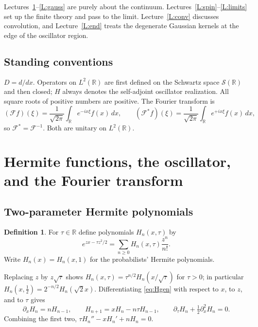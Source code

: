 \documentclass[11pt,reqno]{amsart}
\theoremstyle{definition}
\newtheorem{definition}[theorem]{Definition}
\theoremstyle{remark}
\newcommand{\R}{\mathbb R}
\newcommand{\F}{\mathcal F}
\begin{document}
Lectures~\ref{L:hermite}--\ref{L:gauss} are purely about the continuum.
Lectures~\ref{L:spin}--\ref{L:limits} set up the finite theory and pass to
the limit. Lecture~\ref{L:conv} discusses convolution, and
Lecture~\ref{L:end} treats the degenerate Gaussian kernels at the edge
of the oscillator region.

\subsection*{Standing conventions}
$D=d/dx$. Operators on $L^2(\R)$ are first defined on the Schwartz
space $\mathcal S(\R)$ and then closed; $H$ always denotes the
self-adjoint oscillator realization. All square roots of positive numbers
are positive. The Fourier transform is
\begin{equation}\label{eq:F}
(\F f)(\xi)=\frac1{\sqrt{2\pi}}\int_\R e^{-ix\xi}f(x)\,dx,\qquad
(\F^*f)(\xi)=\frac1{\sqrt{2\pi}}\int_\R e^{+ix\xi}f(x)\,dx,
\end{equation}
so $\F^*=\F^{-1}$. Both are unitary on $L^2(\R)$.

\section{Hermite functions, the oscillator, and the Fourier transform}\label{L:hermite}

\subsection{Two-parameter Hermite polynomials}
\begin{definition}
For $\tau\in\R$ define polynomials $H_n(x,\tau)$ by
\begin{equation}\label{eq:Hgen}
e^{zx-\tau z^2/2}=\sum_{n\ge0}H_n(x,\tau)\frac{z^n}{n!}.
\end{equation}
Write $H_n(x)=H_n(x,1)$ for the probabilists' Hermite polynomials.
\end{definition}
Replacing $z$ by $z\sqrt\tau$ shows $H_n(x,\tau)=\tau^{n/2}H_n(x/\sqrt\tau)$
for $\tau>0$; in particular $H_n(x,\tfrac12)=2^{-n/2}H_n(\sqrt2x)$.
Differentiating \eqref{eq:Hgen} with respect to $x$, to $z$, and to
$\tau$ gives
\begin{equation}\label{eq:Hrec}
\partial_xH_n=nH_{n-1},\qquad
H_{n+1}=xH_n-n\tau H_{n-1},\qquad
\partial_\tau H_n+\tfrac12\partial_x^2H_n=0.
\end{equation}
Combining the first two, $\tau H_n''-xH_n'+nH_n=0$.
\end{document}
